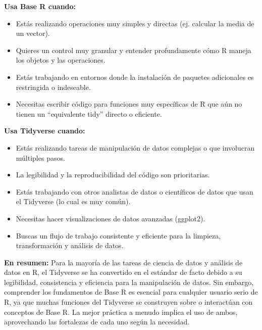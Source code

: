 \documentclass[
  letterpaper,
  DIV=11,
  numbers=noendperiod]{scrartcl}
\providecommand{\tightlist}{%
  \setlength{\itemsep}{0pt}\setlength{\parskip}{0pt}}
\begin{document}
\textbf{Usa Base R cuando:}

\begin{itemize}
\tightlist
\item
  Estás realizando operaciones muy simples y directas (ej. calcular la
  media de un vector).
\item
  Quieres un control muy granular y entender profundamente cómo R maneja
  los objetos y las operaciones.
\item
  Estás trabajando en entornos donde la instalación de paquetes
  adicionales es restringida o indeseable.
\item
  Necesitas escribir código para funciones muy específicas de R que aún
  no tienen un ``equivalente tidy'' directo o eficiente.
\end{itemize}

\textbf{Usa Tidyverse cuando:}

\begin{itemize}
\tightlist
\item
  Estás realizando tareas de manipulación de datos complejas o que
  involucran múltiples pasos.
\item
  La legibilidad y la reproducibilidad del código son prioritarias.
\item
  Estás trabajando con otros analistas de datos o científicos de datos
  que usan el Tidyverse (lo cual es muy común).
\item
  Necesitas hacer visualizaciones de datos avanzadas (ggplot2).
\item
  Buscas un flujo de trabajo consistente y eficiente para la limpieza,
  transformación y análisis de datos.
\end{itemize}

\textbf{En resumen:} Para la mayoría de las tareas de ciencia de datos y
análisis de datos en R, el Tidyverse se ha convertido en el estándar de
facto debido a su legibilidad, consistencia y eficiencia para la
manipulación de datos. Sin embargo, comprender los fundamentos de Base R
es esencial para cualquier usuario serio de R, ya que muchas funciones
del Tidyverse se construyen sobre o interactúan con conceptos de Base R.
La mejor práctica a menudo implica el uso de ambos, aprovechando las
fortalezas de cada uno según la necesidad.
\end{document}
